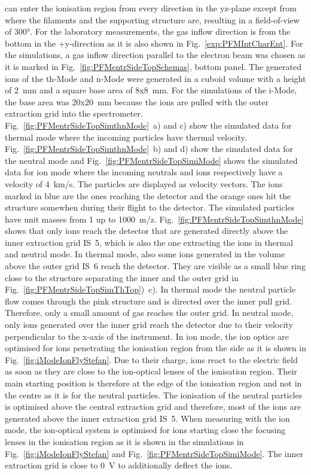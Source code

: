 	can enter the ionisation region from every direction in the yz-plane except from where the filaments and the supporting structure are, resulting in a field-of-view of 300°. For the laboratory measurements, the gas inflow direction is from the bottom in the +y-direction as it is also shown in Fig.~\ref{exp:PFMIntCharEnt}. For the simulations, a gas inflow direction parallel to the electron beam was chosen as it is marked in Fig.~\ref{fig:PFMentrSideTopSchemas}, bottom panel. The generated ions of the th-Mode and n-Mode were generated in a cuboid volume with a height of 2~mm and a square base area of 8x8~mm. For the simulations of the i-Mode, the base area was 20x20~mm because the ions are pulled with the outer extraction grid into the spectrometer.\\
	Fig.~\ref{fig:PFMentrSideTopSimthnMode}~a) and c) show the simulated data for thermal mode where the incoming particles have thermal velocity. Fig.~\ref{fig:PFMentrSideTopSimthnMode}~b) and d) show the simulated data for the neutral mode and Fig.~\ref{fig:PFMentrSideTopSimiMode} shows the simulated data for ion mode where the incoming neutrals and ions respectively have a velocity of 4~km/s. The particles are displayed as velocity vectors. The ions marked in blue are the ones reaching the detector and the orange ones hit the structure somewhen during their flight to the detector. The simulated particles have unit masses from 1 up to 1000~m/z.	Fig.~\ref{fig:PFMentrSideTopSimthnMode} shows that only ions reach the detector that are generated directly above the inner extraction grid IS~5, which is also the one extracting the ions in thermal and neutral mode. In thermal mode, also some ions generated in the volume above the outer grid IS~6 reach the detector. They are visible as a small blue ring close to the structure separating the inner and the outer grid in Fig.~\ref{fig:PFMentrSideTopSimThTop})~c). In thermal mode the neutral particle flow comes through the pink structure and is directed over the inner pull grid. Therefore, only a small amount of gas reaches the outer grid. In neutral mode, only ions generated over the inner grid reach the detector due to their velocity perpendicular to the x-axis of the instrument. In ion mode, the ion optics are optimised for ions penetrating the ionisation region from the side as it is shown in Fig.~\ref{fig:iModeIonFlyStefan}. Due to their charge, ions react to the electric field as soon as they are close to the ion-optical lenses of the ionisation region. Their main starting position is therefore at the edge of the ionisation region and not in the centre as it is for the neutral particles. The ionisation of the neutral particles is optimised above the central extraction grid and therefore, most of the ions are generated above the inner extraction grid IS~5. When measuring with the ion mode, the ion-optical system is optimised for ions starting close the focusing lenses in the ionisation region as it is shown in the simulations in Fig.~\ref{fig:iModeIonFlyStefan} and Fig.~\ref{fig:PFMentrSideTopSimiMode}. The inner extraction grid is close to 0~V to additionally deflect the ions.\\
